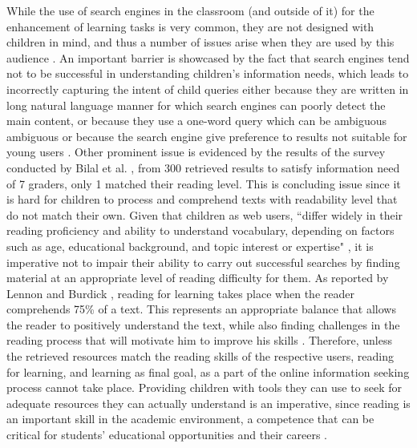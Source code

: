 \documentclass{sig-alternate-05-2015}
\begin{document}
 While the use of  search engines in the classroom (and outside of it) for the enhancement of learning tasks is very common, they are not designed with children in mind, and thus a number of issues arise when they are used by this audience \cite{Gos13,Gra03}. An important barrier is showcased by the fact that search engines tend not to be successful in understanding children's information needs, which leads to incorrectly capturing the intent of child queries either because they are written in long natural language manner for which search engines can poorly detect the main content, or because they use a one-word query which can be ambiguous ambiguous or because the search engine give preference to results not suitable for young users \cite{Bil13}. Other  prominent issue is evidenced by the results of the survey conducted by Bilal et al. \cite{Bil13}, from 300 retrieved results to satisfy information need of 7 graders, only 1 matched their reading level. This is concluding issue since it is hard for children to process and comprehend texts with readability level that do not match their own. Given that children as web users, ``differ widely in their reading proficiency and ability to understand vocabulary, depending on factors such as age, educational background, and topic interest or expertise" \cite{Col11}, it is imperative not to impair their ability to carry out successful searches by finding material at an appropriate level of reading difficulty for them. As reported by Lennon and Burdick \cite{Len04}, reading for learning takes place when the reader comprehends 75\% of a text. This represents an appropriate balance that allows the reader to positively understand the text, while also finding challenges in the reading process that will motivate him to improve his skills \cite{Len04}. Therefore, unless the retrieved resources match the reading skills of the respective users, reading for learning, and learning as final goal, as a part of the online information seeking process cannot take place. Providing children with tools they can use to seek for adequate resources they can actually understand is an imperative, since reading is an important skill in the academic environment, a competence that can be critical for students' educational opportunities and their careers \cite{Rob00}. 
\end{document}
